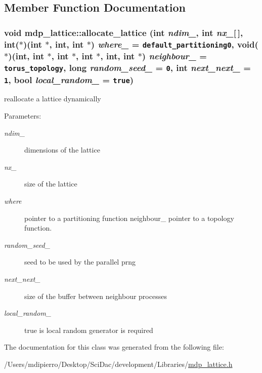 \subsection{Member Function Documentation}
\hypertarget{classmdp__lattice_b98e2af8a05ed69c4b6df4a632fa01ce}{
\subsubsection[{allocate\_\-lattice}]{\setlength{\rightskip}{0pt plus 5cm}void mdp\_\-lattice::allocate\_\-lattice (int {\em ndim\_\-}, \/  int {\em nx\_\-}\mbox{[}$\,$\mbox{]}, \/  int($\ast$)(int $\ast$, int, int $\ast$) {\em where\_\-} = {\tt default\_\-partitioning0}, \/  void($\ast$)(int, int $\ast$, int $\ast$, int $\ast$, int, int $\ast$) {\em neighbour\_\-} = {\tt torus\_\-topology}, \/  long {\em random\_\-seed\_\-} = {\tt 0}, \/  int {\em next\_\-next\_\-} = {\tt 1}, \/  bool {\em local\_\-random\_\-} = {\tt true})}}
\label{classmdp__lattice_b98e2af8a05ed69c4b6df4a632fa01ce}


reallocate a lattice dynamically \begin{Desc}
\item[Parameters:]
\begin{description}
\item[{\em ndim\_\-}]dimensions of the lattice \item[{\em nx\_\-}]size of the lattice \item[{\em where}]pointer to a partitioning function  neighbour\_\- pointer to a topology function. \item[{\em random\_\-seed\_\-}]seed to be used by the parallel prng \item[{\em next\_\-next\_\-}]size of the buffer between neighbour processes \item[{\em local\_\-random\_\-}]true is local random generator is required \end{description}
\end{Desc}


The documentation for this class was generated from the following file:\begin{CompactItemize}
\item 
/Users/mdipierro/Desktop/SciDac/development/Libraries/\hyperlink{mdp__lattice_8h}{mdp\_\-lattice.h}\end{CompactItemize}
